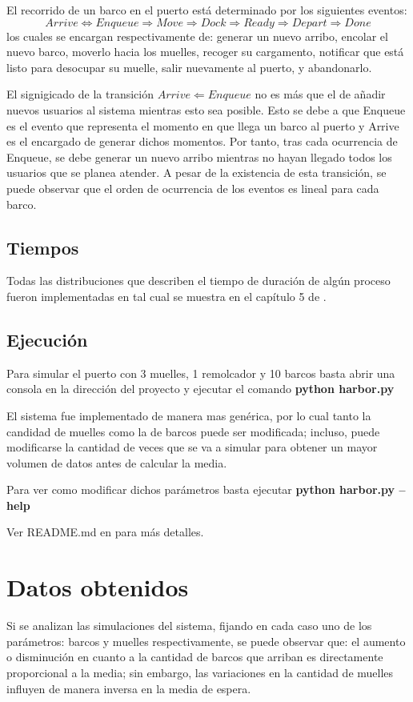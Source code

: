 		El recorrido de un barco en el puerto est\'a determinado por los siguientes eventos:
		$$Arrive \Leftrightarrow Enqueue \Rightarrow  Move \Rightarrow Dock \Rightarrow Ready \Rightarrow Depart \Rightarrow Done$$
		los cuales se
		encargan respectivamente de: generar un nuevo arribo, encolar el nuevo barco, moverlo hacia los
		muelles, recoger su cargamento, notificar que est\'a listo para desocupar su muelle,
		salir nuevamente al puerto, y abandonarlo.

		El signigicado de la transici\'on $Arrive \Leftarrow Enqueue$ no es
		m\'as que el de a\~nadir nuevos usuarios al sistema mientras esto sea posible. Esto
		se debe a que Enqueue es el evento que representa el momento en que llega un barco al
		puerto y Arrive es el encargado de generar dichos momentos. Por tanto, tras cada
		ocurrencia de Enqueue, se debe generar un nuevo arribo mientras no hayan llegado
		todos los usuarios que se planea atender. A pesar de la existencia de esta transici\'on, se puede observar que el orden de ocurrencia de los eventos es lineal para cada 
		barco. 

	\subsection{Tiempos}
		Todas las distribuciones que describen el tiempo de duraci\'on de alg\'un
		proceso fueron implementadas en \cite{utils} tal cual se muestra en el cap\'itulo 5
		de \cite{ross}.

	\subsection{Ejecuci\'on}
		Para simular el puerto con 3 muelles, 1 remolcador y 10 barcos basta abrir 
		una consola en la direcci\'on del proyecto y ejecutar el comando
		{\bf{python harbor.py}}
		
		El sistema fue implementado de manera mas gen\'erica, por lo cual tanto la candidad
		de muelles como la de barcos puede ser modificada; incluso, puede
		modificarse la cantidad de veces que se va a simular para obtener un mayor volumen
		de datos antes de calcular la media.
		
		Para ver como modificar dichos par\'ametros basta ejecutar
		{\bf{python harbor.py --help}}

		Ver README.md en \cite{repo} para m\'as detalles.

\section{Datos obtenidos}
	Si se analizan las simulaciones del sistema, fijando en cada caso uno de los par\'ametros: barcos y muelles respectivamente, se puede observar que: el aumento o disminuci\'on en cuanto a la cantidad de barcos que arriban es directamente proporcional a la media; sin embargo, las variaciones en la cantidad de muelles influyen de manera inversa en la media de espera. 
	
